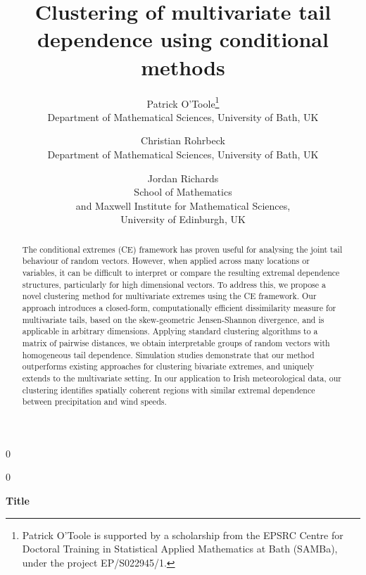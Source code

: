 \documentclass[12pt,compact]{article}
\newcommand{\blind}{0}
\begin{document}
\def\spacingset#1{\renewcommand{\baselinestretch}%
{#1}\small\normalsize} \spacingset{1}


\blind
{
  \title{\bf Clustering of multivariate tail dependence using conditional methods}
  \author{%
  Patrick O'Toole\thanks{Patrick O'Toole is supported by a scholarship from the EPSRC Centre for Doctoral Training in Statistical Applied Mathematics at Bath (SAMBa), under the project EP/S022945/1.}\\
  Department of Mathematical Sciences, University of Bath, UK
  \and
  Christian Rohrbeck\\
  Department of Mathematical Sciences, University of Bath, UK 
  \and
  Jordan Richards\\
  School of Mathematics \\
  and Maxwell Institute for Mathematical Sciences, \\
  University of Edinburgh, UK
  }
  \maketitle
} \fi

\blind
{
  \bigskip
  \bigskip
  \bigskip
  \begin{center}
    {\LARGE\bf Title}
\end{center}
  \medskip
} \fi


\begin{abstract}
The conditional extremes (CE) framework has proven useful for analysing the joint tail behaviour of random vectors.
  However, when applied across many locations or variables, it can be difficult to interpret or compare the resulting extremal dependence structures, particularly for high dimensional vectors. 
  To address this, we propose a novel clustering method for multivariate extremes using the CE framework.
  Our approach introduces a closed-form, computationally efficient dissimilarity measure for multivariate tails, based on the skew-geometric Jensen-Shannon divergence, and is applicable in arbitrary dimensions.
  Applying standard clustering algorithms to a matrix of pairwise distances, we obtain interpretable groups of random vectors with homogeneous tail dependence.
  Simulation studies demonstrate that our method outperforms existing approaches for clustering bivariate extremes, and uniquely extends to the multivariate setting. 
  In our application to Irish meteorological data, our clustering identifies spatially coherent regions with similar extremal dependence between precipitation and wind speeds. 
\end{abstract}
\end{document}

